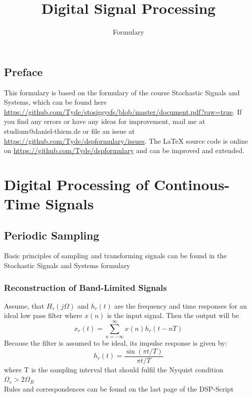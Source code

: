 \documentclass[accentcolor=tud4c,9.5pt,nochapname,bigchapter,paper=a5report]{tudreport}
\begin{document}
\def\Var{{\rm Var}\,}
\def\E{{\rm E}\,}
\def\freq{{\left(e^{j\omega}\right)}\,}


\title{Digital Signal Processing}
\subtitle{Formulary}

\maketitle
\newpage
\thispagestyle{plain}
\mbox{}
\tableofcontents


\section*{Preface}
This formulary is based on the formulary of the course Stochastic Signals and Systems,
 which can be found here \url{https://github.com/Tyde/stosigsysfs/blob/master/document.pdf?raw=true}.
If you find any errors or have any ideas for improvement, mail me at studium@daniel-thiem.de
 or file an issue at \url{https://github.com/Tyde/dspformulary/issues}. The \LaTeX{}  source code is
online on \url{https://github.com/Tyde/dspformulary} and can be improved and extended.

\chapter{Digital Processing of Continous-Time Signals}
\section{Periodic Sampling}
Basic principles of sampling and transforming signals can be found in the Stochastic Signals and Systems formulary
\subsection{Reconstruction of Band-Limited Signals}
Assume, that $H_r(j\Omega)$ and $h_r(t)$ are the frequency and time responses for an ideal low pass filter where 
$x(n)$ is the input signal. Then the output will be
\begin{equation}
	x_r(t) = \sum\limits_{n=-\infty}^{\infty} x(n)h_r(t-nT)
\end{equation}
Because the filter is assumed to be ideal, its impulse response is given by:
\begin{equation}
	h_r(t)=\frac{\sin(\pi t/T)}{\pi t/T}
\end{equation}
where T is the sampling interval that should fulfil the Nyquist condition $\Omega_s > 2 \Omega_B$\\
Rules and correspondences can be found on the last page of the DSP-Script
\end{document}
